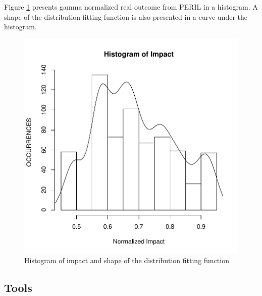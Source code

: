 \documentclass[a4paper,twoside]{article}
\begin{document}
Figure \ref{fig:impacthistogram} presents gamma normalized real outcome from PERIL in a histogram. A shape of the distribution fitting function is also presented in a curve under the histogram.

\begin{figure}[!h]
  \vspace{-0.2cm}
  \centering
  \includegraphics[width=\columnwidth]{images/impact_histogram.pdf}
  \caption{Histogram of impact and shape of the distribution fitting function}
  \label{fig:impacthistogram}
\end{figure}

\subsection{Tools}
\label{sec:tools}
\end{document}
